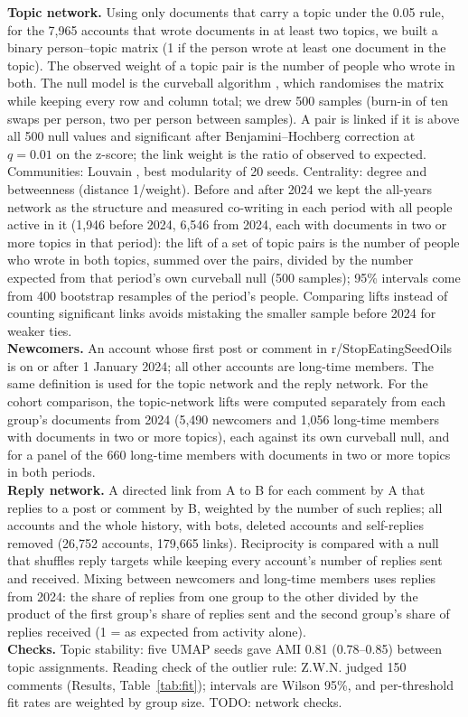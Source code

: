 {\textbf{Topic network.} Using only documents that carry a topic under the 0.05 rule, for the 7{,}965 accounts that wrote documents in at least two topics, we built a binary person--topic matrix (1 if the person wrote at least one document in the topic). The observed weight of a topic pair is the number of people who wrote in both. The null model is the curveball algorithm \cite{strona2014curveball}, which randomises the matrix while keeping every row and column total; we drew 500 samples (burn-in of ten swaps per person, two per person between samples). A pair is linked if it is above all 500 null values and significant after Benjamini--Hochberg correction \cite{benjamini1995fdr} at $q=0.01$ on the z-score; the link weight is the ratio of observed to expected. Communities: Louvain \cite{blondel2008louvain}, best modularity of 20 seeds. Centrality: degree and betweenness (distance 1/weight). Before and after 2024 we kept the all-years network as the structure and measured co-writing in each period with all people active in it (1{,}946 before 2024, 6{,}546 from 2024, each with documents in two or more topics in that period): the lift of a set of topic pairs is the number of people who wrote in both topics, summed over the pairs, divided by the number expected from that period's own curveball null (500 samples); 95\% intervals come from 400 bootstrap resamples of the period's people. Comparing lifts instead of counting significant links avoids mistaking the smaller sample before 2024 for weaker ties. \\
\textbf{Newcomers.} An account whose first post or comment in r/StopEatingSeedOils is on or after 1 January 2024; all other accounts are long-time members. The same definition is used for the topic network and the reply network. For the cohort comparison, the topic-network lifts were computed separately from each group's documents from 2024 (5{,}490 newcomers and 1{,}056 long-time members with documents in two or more topics), each against its own curveball null, and for a panel of the 660 long-time members with documents in two or more topics in both periods. \\
\textbf{Reply network.} A directed link from A to B for each comment by A that replies to a post or comment by B, weighted by the number of such replies; all accounts and the whole history, with bots, deleted accounts and self-replies removed (26{,}752 accounts, 179{,}665 links). Reciprocity is compared with a null that shuffles reply targets while keeping every account's number of replies sent and received. Mixing between newcomers and long-time members uses replies from 2024: the share of replies from one group to the other divided by the product of the first group's share of replies sent and the second group's share of replies received (1 = as expected from activity alone). \\
\textbf{Checks.} Topic stability: five UMAP seeds gave AMI 0.81 (0.78--0.85) between topic assignments. Reading check of the outlier rule: Z.W.N. judged 150 comments (Results, Table~\ref{tab:fit}); intervals are Wilson 95\%, and per-threshold fit rates are weighted by group size. TODO: network checks.
}

\showmatmethods{}


